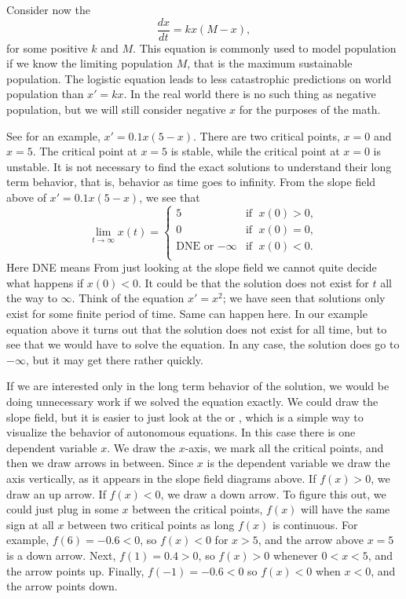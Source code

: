 \medskip

Consider now the \emph{}
\begin{equation*}
\frac{dx}{dt} = kx(M-x) ,
\end{equation*}
for some positive $k$ and $M$.  This equation is commonly used to model
population if we know the limiting population $M$, that is the maximum
sustainable population.  The logistic equation leads to 
less catastrophic
predictions on world population than $x'=kx$.  In the real world there is no
such thing as negative population, but we will still consider negative $x$ for
the purposes of the math.

See  for an example, $x' = 0.1 x(5-x)$.
There are two critical points, $x=0$ and $x=5$.  The critical point
at $x=5$ is stable, while the critical point at $x=0$ is
unstable.
It is not necessary to find the exact solutions to understand their long
term behavior, that is, behavior as time goes to infinity.
From the slope field above of
$x' = 0.1 x(5-x)$, we 
see that
\begin{equation*}
\lim_{t\to \infty} x(t) = 
\begin{cases}
5 & \text{if } \; x(0) > 0 , \\
0 & \text{if } \; x(0) = 0 , \\
\text{DNE or } {-\infty} & \text{if } \; x(0) < 0 . \\
\end{cases}
\end{equation*}
Here DNE means   From just looking at the slope field we
cannot quite decide what happens if $x(0) < 0$.  It could be that the
solution does not exist for $t$ all the way to $\infty$.
Think of the equation $x' = x^2$; we
have seen that solutions only exist for some finite period of time.  Same can happen
here.  In our example equation above it turns out that the
solution does not exist for all time, but to see that we would have to solve
the equation.  In any case, the solution does go to $-\infty$, but it may get
there rather quickly.


If we are interested only in the long term behavior of the solution, 
we would be doing unnecessary work if we solved the
equation exactly.
We could draw the slope field, but
it is easier to just look at the \emph{} or
\emph{}, which is a simple
way to visualize the behavior of
autonomous equations.  In this case there is one dependent variable $x$.
We draw the $x$-axis, we mark all the critical points,
and then we draw arrows in
between.  Since $x$ is the dependent variable we draw the axis vertically,
as it appears in the slope field diagrams above.
If $f(x) > 0$, we draw an up arrow.  If $f(x) < 0$, we draw 
a down arrow.
To figure this out, we could just plug in some $x$ between the critical
points, $f(x)$ will have the same sign at all $x$ between two critical
points as long $f(x)$ is continuous.
For example, $f(6) = -0.6 < 0$, so $f(x) < 0$ for $x > 5$,
and the arrow above $x=5$ is a down
arrow.  Next, $f(1) = 0.4 > 0$, so $f(x) > 0$ whenever $0 < x < 5$, and
the arrow points up.  Finally, $f(-1) = -0.6 < 0$ so $f(x) < 0$ when $x <
0$, and the arrow points down.

